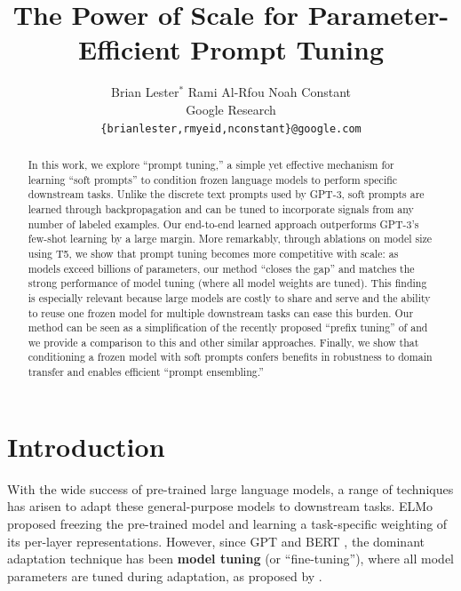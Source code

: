 \documentclass[11pt]{article}
\title{The Power of Scale for Parameter-Efficient Prompt Tuning}
\author{
Brian Lester$^*$ \enskip Rami Al-Rfou \enskip Noah Constant \\
Google Research \\
\texttt{\{brianlester,rmyeid,nconstant\}@google.com} \\
}
\begin{document}
\maketitle
\begin{abstract}
In this work, we explore ``prompt tuning,'' a simple yet effective mechanism for learning ``soft prompts'' to condition frozen language models to perform specific downstream tasks.
Unlike the discrete text prompts used by \mbox{GPT-3}, soft prompts are learned through backpropagation and can be tuned to incorporate signals from any number of labeled examples.
Our end-to-end learned approach outperforms \mbox{GPT-3's} few-shot learning by a large margin.
More remarkably, through ablations on model size using T5, we show that prompt tuning becomes more competitive with scale: as models exceed billions of parameters, our method ``closes the gap'' and matches the strong performance of model tuning (where all model weights are tuned).
This finding is especially relevant because large models are costly to share and serve and the ability to reuse one frozen model for multiple downstream tasks can ease this burden.
Our method can be seen as a simplification of the recently proposed ``prefix tuning'' of \citet{li_2021_prefix_tuning} and we provide a comparison to this and other similar approaches.
Finally, we show that conditioning a frozen model with soft prompts confers benefits in robustness to domain transfer and enables efficient ``prompt ensembling.''
\end{abstract}

\renewcommand{\thefootnote}{$^*$}
\renewcommand\thefootnote{\arabic{footnote}}


\section{Introduction}

With the wide success of pre-trained large language models, a range of techniques has arisen to adapt these general-purpose models to downstream tasks.
ELMo \cite{peters-etal-2018-deep} proposed freezing the pre-trained model and learning a task-specific weighting of its per-layer representations. However, since GPT \cite{gpt} and BERT \cite{devlin-etal-2019-bert}, the dominant adaptation technique has been \textbf{model tuning} (or ``fine-tuning''), where all model parameters are tuned during adaptation, as proposed by \citet{howard-ruder-2018-universal}.
\end{document}
